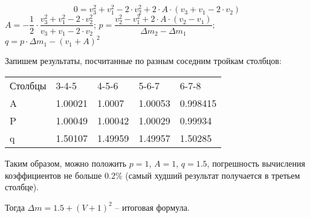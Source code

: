 $$0=v_3^2+v_1^2-2 \cdot v_2^2+2 \cdot A \cdot (v_3+v_1-2 \cdot v_2 )  $$
$A=-\dfrac{1}{2} \cdot \dfrac{v_3^2+v_1^2-2 \cdot v_2^2}{v_3+v_1-2 \cdot v_2}$; 
$p=\dfrac{v_2^2-v_1^2+2 \cdot A \cdot (v_2-v_1 )}{\Delta m_2-\Delta m_1};$ $q=p \cdot \Delta m_1-(v_1+A)^2 $

Запишем результаты, посчитанные по разным соседним тройкам столбцов:

\begin{tabular}{l l l l l}
    Столбцы & 3-4-5 & 4-5-6	& 5-6-7	& 6-7-8 \\
    A &	1.00021 & 1.0007 &	1.00053 &	0.998415 \\
    P &	1.00049 &	1.00042 &	1.00029 &	0.99934 \\
    q & 	1.50107 &	1.49959 &	1.49957 &	1.50285
\end{tabular}

Таким образом, можно положить $p = 1$, $A = 1$, $q = 1.5$, погрешность вычисления коэффициентов не 
больше $0.2 \%$ (самый худший результат получается в третьем столбце). 

Тогда $\Delta m=1.5+(V+1)^2$ – итоговая формула. 


